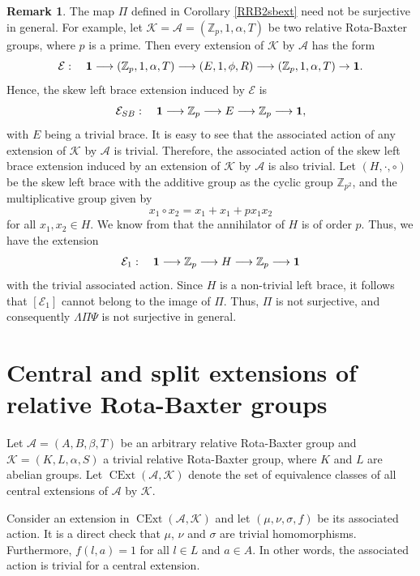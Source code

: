 \documentclass[11pt]{amsart}
\theoremstyle{thrm}
\theoremstyle{plain}
\theoremstyle{definition}
\newtheorem{remark}[equation]{Remark}
\newcommand{\CExt}{\operatorname{CExt} }
\numberwithin{equation}{section}
\begin{document}
\begin{remark}
	The map $\Pi$ defined in Corollary \ref{RRB2sbext} need not be surjective in general. For example, let $\mathcal{K} = \mathcal{A} = (\mathbb{Z}_p, 1, \alpha, T)$ be two relative Rota-Baxter groups, where $p$ is a prime. Then every extension of $\mathcal{K}$ by $\mathcal{A}$ has the form
	$$\mathcal{E}: \quad {\bf 1} \longrightarrow (\mathbb{Z}_p, 1, \alpha, T) \longrightarrow (E, 1, \phi, R) \longrightarrow (\mathbb{Z}_p, 1, \alpha, T) \rightarrow {\bf 1}.$$
	Hence, the skew left brace extension induced by $\mathcal{E}$ is
	$$\mathcal{E}_{SB}: \quad {\bf 1} \longrightarrow \mathbb{Z}_p \longrightarrow E \longrightarrow \mathbb{Z}_p \longrightarrow {\bf 1},$$
	with $E$ being a trivial brace. It is easy to see that the associated action of any extension of $\mathcal{K}$ by $\mathcal{A}$ is trivial. Therefore, the associated action of the skew left brace extension induced by an extension of $\mathcal{K}$ by $\mathcal{A}$ is also trivial. Let $(H, \cdot, \circ)$ be the skew left brace with the additive group as the cyclic group $\mathbb{Z}_{p^2}$, and the multiplicative group given by $$x_1 \circ x_2 = x_1 + x_1 + p x_1 x_2$$ for all $x_1, x_2 \in H$. We know from \cite[p.4]{DB18} that the annihilator of $H$ is of order  $p$. Thus, we have the extension
	$$\mathcal{E}_{1}: \quad {\bf 1} \longrightarrow \mathbb{Z}_p \longrightarrow H \longrightarrow \mathbb{Z}_p \longrightarrow {\bf 1}$$  
	with the trivial associated action. Since $H$ is a non-trivial left brace, it follows that $[\mathcal{E}_1]$ cannot belong to the image of $\Pi$. Thus, $\Pi$ is not surjective, and consequently $\Lambda \Pi \Psi$ is not surjective in general.
\end{remark}


\section{Central and split extensions of relative Rota-Baxter groups} \label{sec central and split RRB}
Let $\mathcal{A} = (A, B, \beta, T)$ be an arbitrary relative Rota-Baxter group and  $\mathcal{K} = (K, L, \alpha, S)$ a trivial relative Rota-Baxter group, where $K$ and $L$ are abelian groups.  Let $\CExt(\mathcal{A}, \mathcal{K})$ denote the set of equivalence classes of all central extensions of $\mathcal{A}$ by $\mathcal{K}$.

Consider an extension in $\CExt(\mathcal{A}, \mathcal{K})$ and let $(\mu, \nu, \sigma, f)$ be its associated action. It is a direct check that $\mu$, $\nu$ and $\sigma$ are trivial homomorphisms. Furthermore, $f(l, a) = 1$ for all $l \in L$ and $a \in A$.  In other words, the associated action is trivial for a central extension. 
\par
\end{document}

